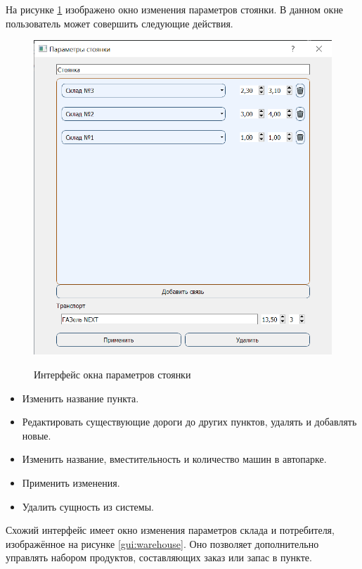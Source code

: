 \qquad
На рисунке \ref{gui:parking} изображено окно изменения параметров стоянки. В данном окне пользователь может совершить следующие действия.

\begin{figure}[hp]
	\begin{center}
		{\includegraphics[scale=0.8, angle=0, page=1]{img/parking_page.png}}
		\caption{Интерфейс окна параметров стоянки}
		\label{gui:parking}
	\end{center}
\end{figure}

\begin{itemize}
	\item Изменить название пункта.
	\item Редактировать существующие дороги до других пунктов, удалять и добавлять новые.
	\item Изменить название, вместительность и количество машин в автопарке.
	\item Применить изменения.
	\item Удалить сущность из системы.
\end{itemize}

Схожий интерфейс имеет окно изменения параметров склада и потребителя, изображённое на рисунке \ref{gui:warehouse}. Оно позволяет дополнительно управлять набором продуктов, составляющих заказ или запас в пункте.

